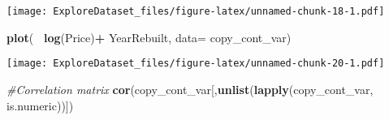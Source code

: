 \documentclass[]{article}
\newenvironment{Shaded}{\begin{snugshade}}{\end{snugshade}}
\newcommand{\CommentTok}[1]{\textcolor[rgb]{0.56,0.35,0.01}{\textit{#1}}}
\newcommand{\DataTypeTok}[1]{\textcolor[rgb]{0.13,0.29,0.53}{#1}}
\newcommand{\KeywordTok}[1]{\textcolor[rgb]{0.13,0.29,0.53}{\textbf{#1}}}
\newcommand{\NormalTok}[1]{#1}
\newcommand{\OperatorTok}[1]{\textcolor[rgb]{0.81,0.36,0.00}{\textbf{#1}}}
\newcommand{\StringTok}[1]{\textcolor[rgb]{0.31,0.60,0.02}{#1}}
\begin{document}
\texttt{[image: ExploreDataset\_files/figure-latex/unnamed-chunk-18-1.pdf]}

\begin{Shaded}
\begin{Highlighting}[]
\KeywordTok{plot}\NormalTok{(}\OperatorTok{~}\StringTok{ }\KeywordTok{log}\NormalTok{(Price)}\OperatorTok{+}\StringTok{ }\NormalTok{YearRebuilt, }\DataTypeTok{data=}\NormalTok{ copy_cont_var) }
\end{Highlighting}
\end{Shaded}

\texttt{[image: ExploreDataset\_files/figure-latex/unnamed-chunk-20-1.pdf]}

\begin{Shaded}
\begin{Highlighting}[]
\CommentTok{#Correlation matrix}
\KeywordTok{cor}\NormalTok{(copy_cont_var[,}\KeywordTok{unlist}\NormalTok{(}\KeywordTok{lapply}\NormalTok{(copy_cont_var, is.numeric))])}
\end{Highlighting}
\end{Shaded}
\end{document}
